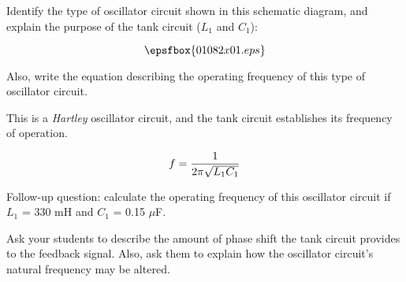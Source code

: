 

Identify the type of oscillator circuit shown in this schematic diagram, and explain the purpose of the tank circuit ($L_1$ and $C_1$):

$$\epsfbox{01082x01.eps}$$

Also, write the equation describing the operating frequency of this type of oscillator circuit.







This is a {\it Hartley} oscillator circuit, and the tank circuit establishes its frequency of operation.

$$f = {1 \over {2 \pi \sqrt{L_1 C_1}}}$$

\vskip 10pt

Follow-up question: calculate the operating frequency of this oscillator circuit if $L_1$ = 330 mH and $C_1$ = 0.15 $\mu$F.







Ask your students to describe the amount of phase shift the tank circuit provides to the feedback signal.  Also, ask them to explain how the oscillator circuit's natural frequency may be altered.




